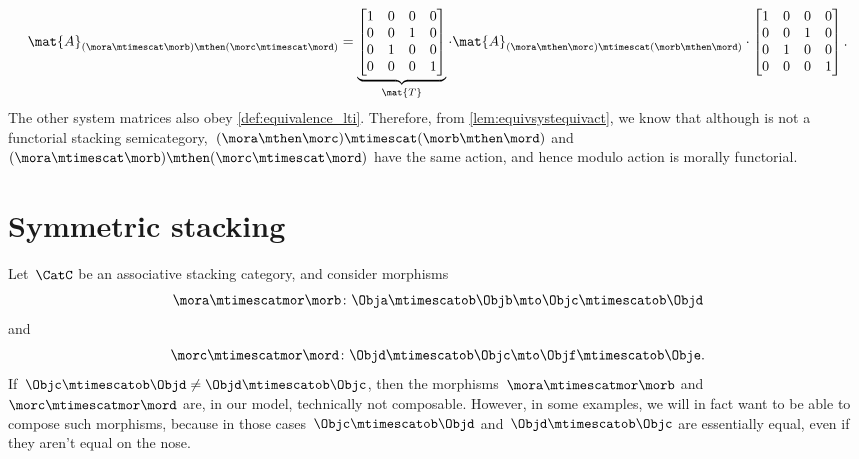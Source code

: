 \begin{example}
    \begin{equation*}
        \mat{A}_{(\mora\mtimescat \morb)\mthen (\morc\mtimescat \mord)}=
        \underbrace{\begin{bmatrix}
                1 & 0 & 0 & 0 \\
                0 & 0 & 1 & 0 \\
                0 & 1 & 0 & 0 \\
                0 & 0 & 0 & 1
            \end{bmatrix}}_{\mat{T}}\cdot
        \mat{A}_{(\mora \mthen \morc)\mtimescat (\morb\mthen \mord)}
        \cdot
        \begin{bmatrix}
            1 & 0 & 0 & 0 \\
            0 & 0 & 1 & 0 \\
            0 & 1 & 0 & 0 \\
            0 & 0 & 0 & 1
        \end{bmatrix}.
    \end{equation*}
    The other system matrices also obey \cref{def:equivalence_lti}.
    Therefore, from \cref{lem:equivsystequivact}, we know that although \LTI is not a functorial stacking semicategory,~$(\mora \mthen \morc)\mtimescat (\morb\mthen \mord)$ and~$(\mora\mtimescat \morb)\mthen (\morc\mtimescat \mord)$ have the same action, and hence \LTI modulo action is morally functorial.
\end{example}

\section{Symmetric stacking}

Let~$\CatC$ be an associative stacking category, and consider morphisms
\begin{equation*}
    \mora \mtimescatmor \morb \colon \Obja \mtimescatob \Objb \mto \Objc \mtimescatob \Objd
\end{equation*}
and
\begin{equation*}
    \morc \mtimescatmor \mord \colon \Objd \mtimescatob \Objc \mto \Objf \mtimescatob \Obje.
\end{equation*}
If~$\Objc \mtimescatob \Objd \neq \Objd \mtimescatob \Objc$, then the morphisms~$\mora \mtimescatmor \morb$ and~$\morc \mtimescatmor \mord$ are, in our model, technically not composable.
However, in some examples, we will in fact want to be able to compose such morphisms, because in those cases~$\Objc \mtimescatob \Objd$ and~$\Objd \mtimescatob \Objc$ are essentially equal, even if they aren't equal on the nose.

